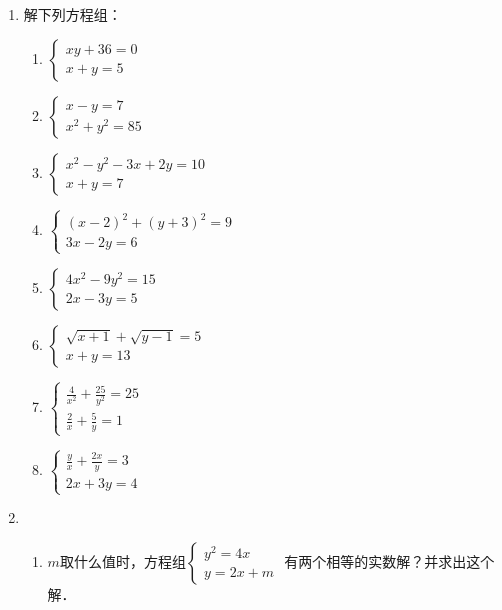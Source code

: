 \begin{enumerate}
    \item 解下列方程组：
\begin{multicols}{2}
\begin{enumerate}
    \item $\begin{cases}
        xy+36=0\\x+y=5
    \end{cases}$
    \item $\begin{cases}
        x-y=7\\x^2+y^2=85
    \end{cases}$
    \item $\begin{cases}
        x^2-y^2-3x+2y=10\\x+y=7
    \end{cases}$
    \item $\begin{cases}
        (x-2)^2+(y+3)^2=9\\ 3x-2y=6
    \end{cases}$
    \item $\begin{cases}
        4x^2-9y^2=15\\ 2x-3y=5
    \end{cases}$
    \item $\begin{cases}
        \sqrt{x+1}+\sqrt{y-1}=5\\ x+y=13
    \end{cases}$
    \item $\begin{cases}
        \frac{4}{x^2}+\frac{25}{y^2}=25\\
        \frac{2}{x}+\frac{5}{y}=1
    \end{cases}$
    \item $\begin{cases}
        \frac{y}{x}+\frac{2x}{y}=3\\
        2x+3y=4
    \end{cases}$

\end{enumerate}
\end{multicols}

\item \begin{enumerate}
    \item $m$取什么值时，方程组$\begin{cases}
        y^2=4x\\y=2x+m
    \end{cases}$
有两个相等的实数解？并求出这个解．


\end{enumerate}
\end{enumerate}
